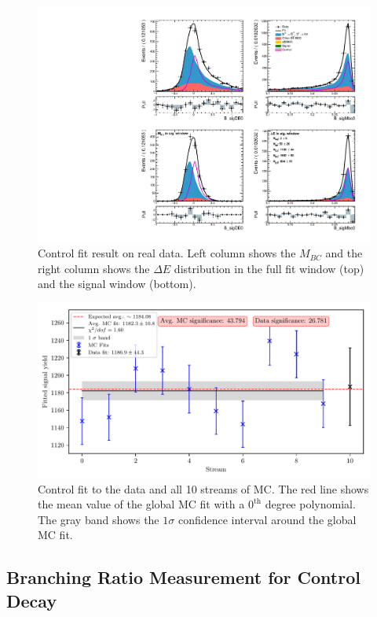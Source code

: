 \begin{figure}[H]
	\centering
	\captionsetup{width=0.8\linewidth}
	\includegraphics[width=\linewidth]{fig/cs_fit_data}
	\caption{Control fit result on real data. Left column shows the $M_{BC}$ and the right column shows the $\Delta E$ distribution in the full fit window (top) and the signal window (bottom).}
	\label{fig:cs_fit_data}
\end{figure}

\begin{figure}[H]
	\centering
	\captionsetup{width=0.8\linewidth}
	\includegraphics[width=\linewidth]{fig/cs_global}
	\caption{Control fit to the data and all 10 streams of MC. The red line shows the mean value of the global MC fit with a $0^{\mathrm{th}}$ degree polynomial. The gray band shows the $1\sigma$ confidence interval around the global MC fit.}
	\label{fig:cs_global}
\end{figure}

\subsection{Branching Ratio Measurement for Control Decay}\label{sec:branching-ratio-measurement-for-control-decay}

